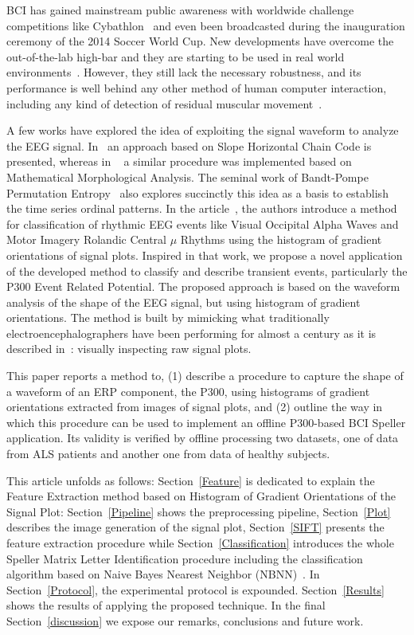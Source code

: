 \documentclass[utf8]{frontiersSCNS} %
\begin{document}
BCI has gained mainstream public awareness with worldwide challenge competitions like Cybathlon~\citep{Riener2014,cybathlon2} and even been broadcasted during the inauguration ceremony of the 2014 Soccer World Cup.  New developments have overcome the out-of-the-lab high-bar and they are starting to be used in real world environments~\citep{Guger2017,Huggins2016}.  However, they still lack the necessary robustness, and its performance is well behind any other method of human computer interaction, including any kind of detection of residual muscular movement~\citep{Clerc}.

A few works have explored the idea of exploiting the signal waveform to analyze the EEG signal.  In~\citep{Alvarado-Gonzalez2016} an approach based on Slope Horizontal Chain Code is presented, whereas in ~\citep{Yamaguchi2009} a similar procedure was implemented based on Mathematical Morphological Analysis.  The seminal work of Bandt-Pompe Permutation Entropy~\citep{Berger2017} also explores succinctly this idea as a basis to establish the time series ordinal patterns.  In the article~\citep{Ramele2016},  the authors introduce a method for classification of rhythmic EEG events like Visual Occipital Alpha Waves  and Motor Imagery Rolandic Central $\mu$ Rhythms using the histogram of gradient orientations of signal plots.  Inspired in that work, we propose a novel application of the developed method to classify and describe transient events, particularly the P300 Event Related Potential.  
The proposed approach is based on the waveform analysis of the shape of the EEG signal, but using histogram of gradient orientations. The method is built by mimicking what traditionally electroencephalographers have been performing for almost a century as it is described in~\citep{Hartman2005}: visually inspecting raw signal plots.

This paper reports a method to, (1) describe a procedure to capture the shape of a waveform of an ERP component, the P300, using histograms of gradient orientations extracted from images of signal plots, and (2) outline the way in which this procedure can be used to implement an offline P300-based BCI Speller application. Its validity is verified by offline processing two datasets, one of data from ALS patients and another one from data of healthy subjects. 

This article unfolds as follows: Section~\ref{Feature} is dedicated to explain the Feature Extraction method based on Histogram of Gradient Orientations of the Signal Plot: Section~\ref{Pipeline} shows the preprocessing pipeline,  Section~\ref{Plot}  describes the image generation of the signal plot, Section~\ref{SIFT}  presents the feature extraction procedure while  Section~\ref{Classification}  introduces the whole  Speller Matrix Letter Identification procedure including the classification algorithm based on Naive Bayes Nearest Neighbor (NBNN)~\citep{Boiman2008}. In Section~\ref{Protocol}, the experimental protocol is expounded. Section~\ref{Results} shows the results of applying the proposed technique.  In the final Section~\ref{discussion}  we expose our remarks, conclusions and future work.
\end{document}
